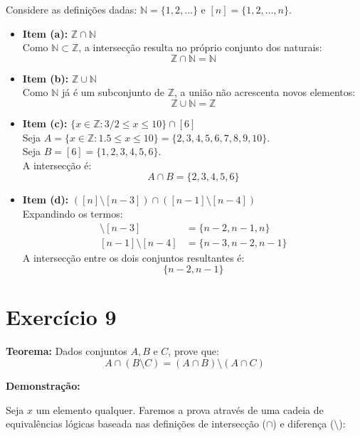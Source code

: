 \documentclass[11pt,reqno,a4paper]{amsart}
\begin{document}
Considere as definições dadas: $\mathbb{N} = \{1, 2, \dots\}$ e $[n] = \{1, 2, \dots, n\}$.

\begin{itemize}
    \item \textbf{Item (a):} $\mathbb{Z} \cap \mathbb{N}$ \\
    Como $\mathbb{N} \subset \mathbb{Z}$, a intersecção resulta no próprio conjunto dos naturais:
    \[ \mathbb{Z} \cap \mathbb{N} = \mathbb{N} \]

    \item \textbf{Item (b):} $\mathbb{Z} \cup \mathbb{N}$ \\
    Como $\mathbb{N}$ já é um subconjunto de $\mathbb{Z}$, a união não acrescenta novos elementos:
    \[ \mathbb{Z} \cup \mathbb{N} = \mathbb{Z} \]

    \item \textbf{Item (c):} $\{x \in \mathbb{Z} : 3/2 \leq x \leq 10\} \cap [6]$ \\
    Seja $A = \{x \in \mathbb{Z} : 1.5 \leq x \leq 10\} = \{2, 3, 4, 5, 6, 7, 8, 9, 10\}$. \\
    Seja $B = [6] = \{1, 2, 3, 4, 5, 6\}$. \\
    A intersecção é:
    \[ A \cap B = \{2, 3, 4, 5, 6\} \]

    \item \textbf{Item (d):} $([n] \setminus [n-3]) \cap ([n-1] \setminus [n-4])$ \\
    Expandindo os termos:
    \begin{align*}
        [n] \setminus [n-3] &= \{n-2, n-1, n\} \\
        [n-1] \setminus [n-4] &= \{n-3, n-2, n-1\}
    \end{align*}
    A intersecção entre os dois conjuntos resultantes é:
    \[ \{n-2, n-1\} \]
\end{itemize}

\newpage
\section*{Exercício 9}

\textbf{Teorema:} Dados conjuntos $A, B$ e $C$, prove que:
\[ A \cap (B \setminus C) = (A \cap B) \setminus (A \cap C) \]

\textbf{Demonstração:}

Seja $x$ um elemento qualquer. Faremos a prova através de uma cadeia de equivalências lógicas baseada nas definições de intersecção ($\cap$) e diferença ($\setminus$):
\end{document}
